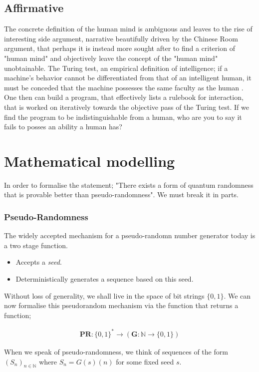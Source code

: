 \documentclass{article}
\begin{document}
\subsection*{Affirmative}
The concrete definition of the human mind is ambiguous and leaves to the rise of interesting side argument, narrative beautifully driven by the Chinese Room \cite{chinese_room} argument, that perhaps it is instead more sought after to find a criterion of "human mind" and objectively leave the concept of the "human mind" unobtainable. The Turing test, an empirical definition of intelligence; if a machine's behavior cannot be differentiated from that of an intelligent human, it must be conceded that the machine possesses the same faculty as the human \cite{turing_test}. One then can build a program, that effectively lists a rulebook for interaction, that is worked on iteratively towards the objective pass of the Turing test. If we find the program to be indistinguishable from a human, who are you to say it fails to posses an ability a human has?

\pagebreak
\section*{Mathematical modelling}
In order to formalise the statement; "There exists a form of quantum randomness that is provable better than pseudo-randomness". We must break it in parts.

\subsubsection*{Pseudo-Randomness}
The widely accepted mechanism for a pseudo-randomn number generator today is a two stage function.

\begin{itemize}
	\item{Accepts a \emph{seed}.}
	\item{Deterministically generates a sequence based on this seed.}
\end{itemize}

Without loss of generality, we shall live in the space of bit strings $\{0, 1\}$. We can now formalise this pseudorandom mechanism via the function that returns a function;

\begin{align*}
	\bm{PR}: \{0,1\}^* \rightarrow (\bm{G}: \mathbb{N} \rightarrow \{0,1\})
\end{align*}

When we speak of pseudo-randomness, we think of sequences of the form $(S_n)_{n \in \mathbb{N}}$ where $S_n = G(s)(n)$ for some fixed seed $s$.
\end{document}
